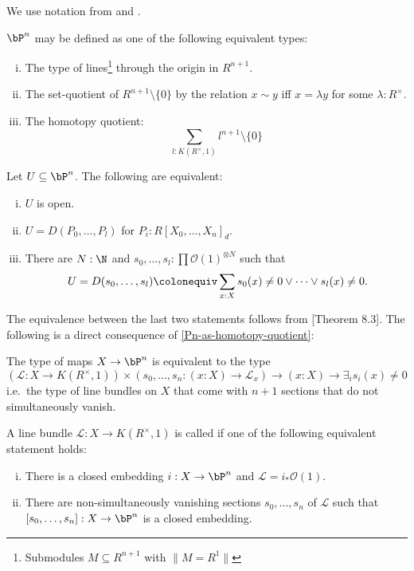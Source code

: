 

We use notation from \cite{draft} and \cite{sag-projective}.

\begin{definition}
  \label{Pn-definitions}
  $\bP^n$ may be defined as one of the following equivalent types:
  \begin{enumerate}[(i)]
  \item The type of lines\footnote{Submodules $M\subseteq R^{n+1}$ with $\| M=R^1 \|$} through the origin in $R^{n+1}$.
  \item The set-quotient of $R^{n+1}\setminus\{0\}$ by the relation $x\sim y$ iff $x=\lambda y$ for some $\lambda :R^\times$.
  \item\label{Pn-as-homotopy-quotient} The homotopy quotient:
    \[
      \sum_{l : K(R^\times,1)} l^{n+1}\setminus\{0\}
    \]
  \end{enumerate}
\end{definition}

\begin{lemma}
  \label{D-for-Pn}
  Let $U\subseteq \bP^n$.
  The following are equivalent:
  \begin{enumerate}[(i)]
  \item $U$ is open.
  \item $U=D(P_0,\dots,P_l)$ for $P_i:R[X_0,\dots,X_n]_d$.
  \item There are $N:\N$ and $s_0,\dots,s_l:\prod \mathcal O(1)^{\otimes N}$ such that
    \[
      U=D(s_0,\dots,s_l)\colonequiv\sum_{x:X}s_0(x)\neq 0\vee \dots \vee s_l(x)\neq 0
      \rlap{.}
    \]
  \end{enumerate}
\end{lemma}

The equivalence between the last two statements follows from \cite{cech-draft}[Theorem 8.3].
The following is a direct consequence of  \ref{Pn-as-homotopy-quotient}:

\begin{remark}
  The type of maps $X\to \bP^n$ is equivalent to the type
  \[
  (\mathcal L:X\to K(R^\times,1))\times (s_0,\dots,s_n:(x:X)\to \mathcal L_x) \to (x:X) \to \exists_{i} s_i(x)\neq 0
  \]
  i.e.\ the type of line bundles on $X$ that come with $n+1$ sections that do not simultaneously vanish.
\end{remark}

\begin{definition}
  A line bundle $\mathcal L:X\to K(R^\times,1)$ is called 
  if one of the following equivalent statement holds:
  \begin{enumerate}[(i)]
  \item There is a closed embedding $i:X\to \bP^n$ and $\mathcal L=i_\ast \mathcal O(1)$.
  \item There are non-simultaneously vanishing sections $s_0,\dots,s_n$ of $\mathcal L$
    such that $[s_0,\dots,s_n]:X\to \bP^n$ is a closed embedding.
  \end{enumerate}
\end{definition}

